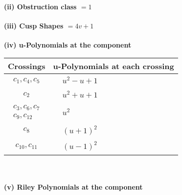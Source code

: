 \documentclass[1p]{elsarticle_modified}
\theoremstyle{definition}
\begin{document}
\flushleft \textbf{(ii) Obstruction class $= 1$}\\~\\
\flushleft \textbf{(iii) Cusp Shapes $= 4 v+1$}\\~\\
\newpage\renewcommand{\arraystretch}{1}
\flushleft \textbf{(iv) u-Polynomials at the component}\newline \\
\begin{tabular}{m{50pt}|m{274pt}}
Crossings & \hspace{64pt}u-Polynomials at each crossing \\
\hline $$\begin{aligned}c_{1},c_{4},c_{5}\end{aligned}$$&$\begin{aligned}
&u^2- u+1
\end{aligned}$\\
\hline $$\begin{aligned}c_{2}\end{aligned}$$&$\begin{aligned}
&u^2+u+1
\end{aligned}$\\
\hline $$\begin{aligned}c_{3},c_{6},c_{7}\\c_{9},c_{12}\end{aligned}$$&$\begin{aligned}
&u^2
\end{aligned}$\\
\hline $$\begin{aligned}c_{8}\end{aligned}$$&$\begin{aligned}
&(u+1)^2
\end{aligned}$\\
\hline $$\begin{aligned}c_{10},c_{11}\end{aligned}$$&$\begin{aligned}
&(u-1)^2
\end{aligned}$\\
\hline
\end{tabular}\\~\\
\newpage\renewcommand{\arraystretch}{1}
\flushleft \textbf{(v) Riley Polynomials at the component}\newline \\
\end{document}
